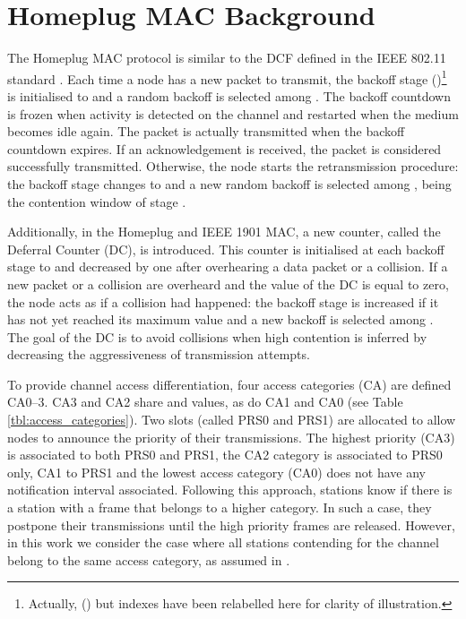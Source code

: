 \documentclass[preprint,12pt]{elsarticle}
\begin{document}
\section{Homeplug MAC Background}\label{sec:background}



The Homeplug MAC protocol is similar to the DCF defined in the IEEE 802.11 standard \cite{IEEE80211-IEEESTD1999}. Each time a node has a new packet to transmit, the backoff stage ()\footnote{Actually, () but indexes have been relabelled here for clarity of illustration.} is initialised to  and a random backoff is selected among . The backoff countdown is frozen when activity is detected on the channel and restarted when the medium becomes idle again. The packet is actually transmitted when the backoff countdown expires. If an acknowledgement is received, the packet is considered successfully transmitted. Otherwise, the node starts the retransmission procedure: the backoff stage changes to  and a new random backoff is selected among , being  the contention window of stage . 

Additionally, in the Homeplug and IEEE 1901 MAC, a new counter, called the Deferral Counter (DC), is introduced. This counter is initialised at each backoff stage to  and decreased by one after overhearing a data packet or a collision. If a new packet or a collision are overheard and the value of the DC is equal to zero, the node acts as if a collision had happened: the backoff stage is increased if it has not yet reached its maximum value and a new backoff is selected among . The goal of the DC is to avoid collisions when high contention is inferred by decreasing the aggressiveness of transmission attempts.

To provide channel access differentiation, four access categories (CA) are defined CA0--3. CA3 and CA2 share  and  values, as do CA1 and CA0 (see Table \ref{tbl:access_categories}). Two slots (called PRS0 and PRS1) are allocated to allow nodes to announce the priority of their transmissions. The highest priority (CA3) is associated to both PRS0 and PRS1, the CA2 category is associated to PRS0 only, CA1 to PRS1 and the lowest access category (CA0) does not have any notification interval associated. Following this approach, stations know if there is a station with a frame that belongs to a higher category. In such a case, they postpone their transmissions until the high priority frames are released. However, in this work we consider the case where all stations contending for the channel belong to the same access category, as assumed in \cite{chung2006performance}.
\end{document}

